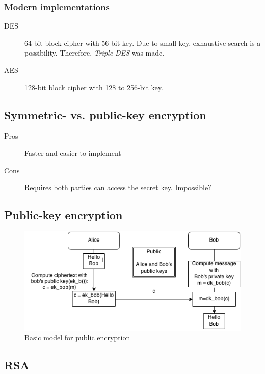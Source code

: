 \subsubsection*{Modern implementations}
\begin{description}
\item[DES] 64-bit block cipher with 56-bit key. Due to small key,
  exhaustive search is a possibility. Therefore, \emph{Triple-DES} was
  made.
\item[AES] 128-bit block cipher with 128 to 256-bit key.
\end{description}

\subsection{Symmetric- vs. public-key encryption}
\begin{description}
\item[Pros] Faster and easier to implement
\item[Cons] Requires both parties can access the secret key. Impossible?
\end{description}

\subsection{Public-key encryption}
\begin{figure}[H]
  \begin{centering}
    \includegraphics[width=15cm]{images/1-pub-enc}
    \caption{Basic model for public encryption}
  \end{centering}
  \label{fig:pub-enc}
\end{figure}

\subsection{RSA}


